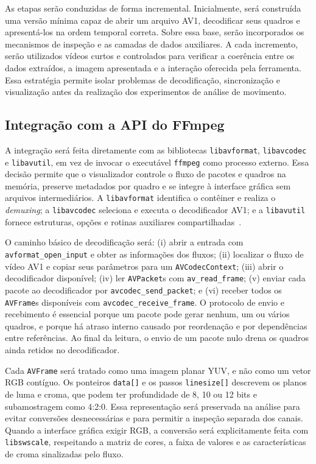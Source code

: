 \documentclass[a4paper,titlepage]{article}
\begin{document}
As etapas serão conduzidas de forma incremental. Inicialmente, será construída uma versão mínima capaz de abrir um arquivo AV1, decodificar seus quadros e apresentá-los na ordem temporal correta. Sobre essa base, serão incorporados os mecanismos de inspeção e as camadas de dados auxiliares. A cada incremento, serão utilizados vídeos curtos e controlados para verificar a coerência entre os dados extraídos, a imagem apresentada e a interação oferecida pela ferramenta. Essa estratégia permite isolar problemas de decodificação, sincronização e visualização antes da realização dos experimentos de análise de movimento.

\subsection{Integração com a API do FFmpeg}

A integração será feita diretamente com as bibliotecas \texttt{libavformat}, \texttt{libavcodec} e \texttt{libavutil}, em vez de invocar o executável \texttt{ffmpeg} como processo externo. Essa decisão permite que o visualizador controle o fluxo de pacotes e quadros na memória, preserve metadados por quadro e se integre à interface gráfica sem arquivos intermediários. A \texttt{libavformat} identifica o contêiner e realiza o \emph{demuxing}; a \texttt{libavcodec} seleciona e executa o decodificador AV1; e a \texttt{libavutil} fornece estruturas, opções e rotinas auxiliares compartilhadas~\cite{ffmpeg}.

O caminho básico de decodificação será: (i) abrir a entrada com \texttt{avformat\_open\_input} e obter as informações dos fluxos; (ii) localizar o fluxo de vídeo AV1 e copiar seus parâmetros para um \texttt{AVCodecContext}; (iii) abrir o decodificador disponível; (iv) ler \texttt{AVPacket}s com \texttt{av\_read\_frame}; (v) enviar cada pacote ao decodificador por \texttt{avcodec\_send\_packet}; e (vi) receber todos os \texttt{AVFrame}s disponíveis com \texttt{avcodec\_receive\_frame}. O protocolo de envio e recebimento é essencial porque um pacote pode gerar nenhum, um ou vários quadros, e porque há atraso interno causado por reordenação e por dependências entre referências. Ao final da leitura, o envio de um pacote nulo drena os quadros ainda retidos no decodificador.

Cada \texttt{AVFrame} será tratado como uma imagem planar YUV, e não como um vetor RGB contíguo. Os ponteiros \texttt{data[]} e os passos \texttt{linesize[]} descrevem os planos de luma e croma, que podem ter profundidade de 8, 10 ou 12 bits e subamostragem como 4:2:0. Essa representação será preservada na análise para evitar conversões desnecessárias e para permitir a inspeção separada dos canais. Quando a interface gráfica exigir RGB, a conversão será explicitamente feita com \texttt{libswscale}, respeitando a matriz de cores, a faixa de valores e as características de croma sinalizadas pelo fluxo.
\end{document}
